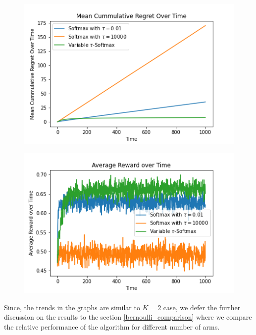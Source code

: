 \documentclass{article}
\begin{document}
		\begin{figure}[H]
		\graphicspath{ {../Experiments/Bernoulli_5_All/} }
		\centering
		\begin{minipage}{.5\textwidth}
		  \centering
		  \includegraphics[width=\linewidth]{Mean_Cummulative_Regret_Over_Time.png}
		  \label{fig:test1}
		\end{minipage}%
		\begin{minipage}{.5\textwidth}
		  \centering
		  \includegraphics[width=\linewidth]{Average_Reward_over_Time.png}
		  \label{fig:test2}
		\end{minipage}
		\end{figure} 
		
		Since, the trends in the graphs are similar to $K=2$ case, we defer the further discussion on the results to the section \ref{bernoulli_comparison}  where we compare
		the relative performance of the algorithm for different number of arms.
		
\end{document}
